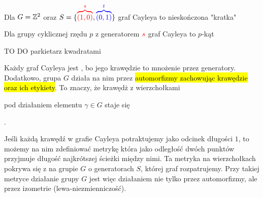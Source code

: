 \begin{example}[m]
\item Dla $G=\mathbb{Z}^2$ oraz $S=\{{\color{red}\overbrace{(1, 0)}^s}, {\color{blue}\overbrace{(0, 1)}^t}\}$ graf Cayleya to nieskończona "kratka"
  \bigskip

  \begin{center}
  \end{center}
\item Dla grupy cyklicznej rzędu $p$ z generatorem $\color{red}s$ graf Cayleya to $p$-kąt
  \begin{center}
  \end{center}
\item {\color{red}\Large TO DO} parkietarz kwadratami
\end{example}

Każdy graf Cayleya jest , bo jego krawędzie to mnożenie przez generatory. Dodatkowo, grupa $G$ działa na nim przez \hl{automorfizmy zachowując krawędzie oraz ich etykiety}. To znaczy, że krawędż z wierzchołkami  pod działaniem elementu $\gamma \in G$ staje się .

Jeśli każdą krawędź w grafie Cayleya potraktujemy jako odcinek długości $1$, to możemy na nim zdefiniować metrykę która jako odległość dwóch punktów przyjmuje długość najkrótszej ścieżki między nimi. Ta metryka na wierzchołkach pokrywa się z  na grupie $G$ o generatorach $S$, której graf rozpatrujemy. Przy takiej metryce działanie grupy $G$ jest więc działaniem nie tylko przez automorfizmy, ale przez izometrie (lewa-niezmienniczość).
